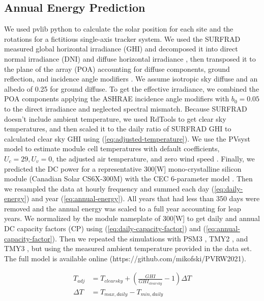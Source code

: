 \documentclass[conference]{IEEEtran}
\begin{document}
\subsection{Annual Energy Prediction}
We used pvlib python \cite{F.Holmgren2018} to calculate the solar position for each site and the rotations for a fictitious single-axis tracker system. We used the SURFRAD measured global horizontal irradiance (GHI) and decomposed it into direct normal irradiance (DNI) and diffuse horizontal irradiance \cite{ERBS1982293}, then transposed it to the plane of the array (POA) accounting for diffuse components, ground reflection, and incidence angle modifiers \cite{HayDavies}. We assume isotropic sky diffuse and an albedo of 0.25 for ground diffuse. To get the effective irradiance, we combined the POA components applying the ASHRAE incidence angle modifiers with $b_0=0.05$ to the direct irradiance and neglected spectral mismatch. Because SURFRAD doesn't include ambient temperature, we used RdTools \cite{Jordan2018} to get clear sky temperatures, and then scaled it to the daily ratio of SURFRAD GHI to calculated clear sky GHI \cite{Ineichen2002} using (\ref{eq:adjusted-temperature}). We use the PVsyst model to estimate module cell temperatures with default coefficients, $U_c=29, U_v=0$, the adjusted air temperature, and zero wind speed \cite{Faimain2008}. Finally, we predicted the DC power for a representative 300[W] mono-crystalline silicon module (Canadian Solar CS6X-300M) with the CEC 6-parameter model \cite{Dobos2012}. Then we resampled the data at hourly frequency and summed each day (\ref{eq:daily-energy}) and year (\ref{eq:annual-energy}). All years that had less than 350 days were removed and the annual energy was scaled to a full year accounting for leap years. We normalized by the module nameplate of 300[W] to get daily and annual DC capacity factors (CP) using (\ref{eq:daily-capacity-factor}) and (\ref{eq:annual-capacity-factor}). Then we repeated the simulations with PSM3 \cite{Habte2017}, TMY2 \cite{Marion1995}, and TMY3 \cite{Wilcox2012}, but using the measured ambient temperature provided in the data set. The full model is available online (https://github.com/mikofski/PVRW2021).

\begin{equation}
\begin{aligned}
T_{adj} &= T_{clearsky} + \left(\frac{GHI}{GHI_{clearsky}} - 1 \right)\Delta T \\
\Delta T &= T_{max,daily} - T_{min,daily} 
\end{aligned}
\label{eq:adjusted-temperature}
\end{equation}
\end{document}
